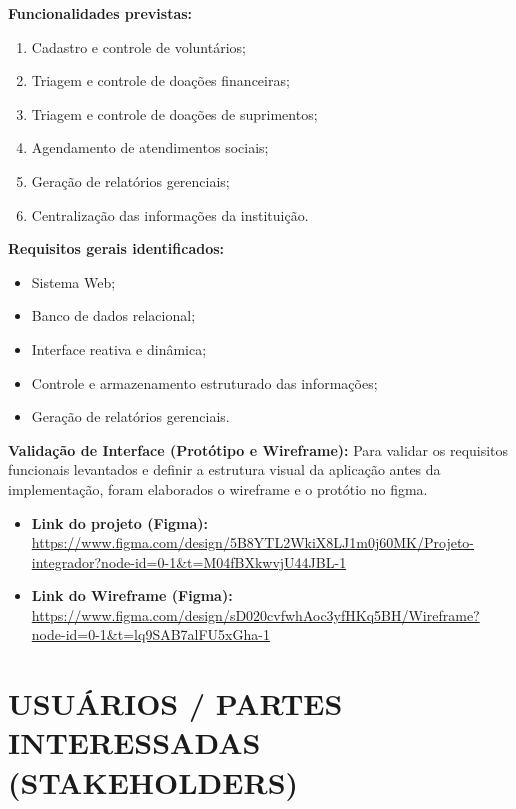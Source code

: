 \documentclass[12pt,a4paper]{article}
\begin{document}
\textbf{Funcionalidades previstas:}

\begin{enumerate}
    \item Cadastro e controle de voluntários;
    \item Triagem e controle de doações financeiras;
    \item Triagem e controle de doações de suprimentos;
    \item Agendamento de atendimentos sociais;
    \item Geração de relatórios gerenciais;
    \item Centralização das informações da instituição.
\end{enumerate}

\textbf{Requisitos gerais identificados:}

\begin{itemize}
    \item Sistema Web;
    \item Banco de dados relacional;
    \item Interface reativa e dinâmica;
    \item Controle e armazenamento estruturado das informações;
    \item Geração de relatórios gerenciais.
\end{itemize}

\textbf{Validação de Interface (Protótipo e Wireframe):}
Para validar os requisitos funcionais levantados e definir a estrutura visual da aplicação antes da implementação, foram elaborados o wireframe e o protótio no figma.

\begin{itemize}
    \item \textbf{Link do projeto (Figma):} \url{https://www.figma.com/design/5B8YTL2WkiX8LJ1m0j60MK/Projeto-integrador?node-id=0-1&t=M04fBXkwvjU44JBL-1}
    \item  \textbf{Link do Wireframe (Figma):} \url{https://www.figma.com/design/sD020cvfwhAoc3yfHKq5BH/Wireframe?node-id=0-1&t=lq9SAB7alFU5xGha-1}
\end{itemize}


\section*{USUÁRIOS / PARTES INTERESSADAS (STAKEHOLDERS)}
\end{document}
